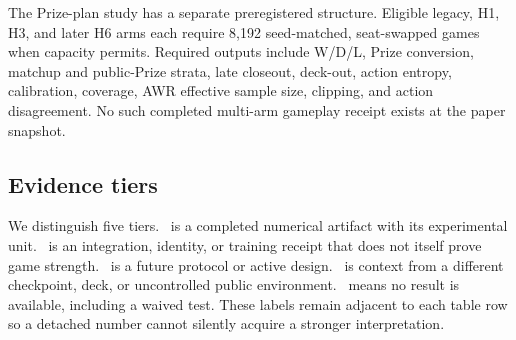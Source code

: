 The Prize-plan study has a separate preregistered structure. Eligible legacy,
H1, H3, and later H6 arms each require 8,192 seed-matched, seat-swapped games
when capacity permits. Required outputs include W/D/L, Prize conversion,
matchup and public-Prize strata, late closeout, deck-out, action entropy,
calibration, coverage, AWR effective sample size, clipping, and action
disagreement. No such completed multi-arm gameplay receipt exists at the paper
snapshot.

\subsection{Evidence tiers}

We distinguish five tiers. \Measured\ is a completed numerical artifact with
its experimental unit. \Verified\ is an integration, identity, or training
receipt that does not itself prove game strength. \Configured\ is a future
protocol or active design. \Historical\ is context from a different checkpoint,
deck, or uncontrolled public environment. \NotMeasured\ means no result is
available, including a waived test. These labels remain adjacent to each table
row so a detached number cannot silently acquire a stronger interpretation.
